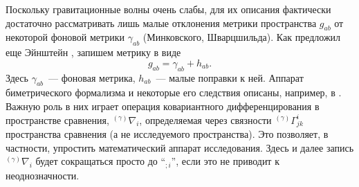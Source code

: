 \documentclass[\docroot/reports/draft/report.tex]{subfiles}
\begin{document}
    Поскольку гравитационные волны очень слабы, для их описания фактически достаточно рассматривать лишь малые отклонения метрики пространства $g_{ab}$ от некоторой фоновой метрики $\gamma_{ab}$ (Минковского, Шварцшильда). Как предложил еще Эйнштейн \cite{einstein_grav_waves}, запишем метрику в виде
    \begin{equation}\label{eq:gab}
        g_{ab} = \gamma_{ab} + h_{ab} .
    \end{equation}
    Здесь $\gamma_{ab}$~--- фоновая метрика, $h_{ab}$~--- малые поправки к ней. Аппарат биметрического формализма и некоторые его следствия описаны, например, в \cite{burlankov_jetp_covar_cosn}. Важную роль в них играет операция ковариантного дифференцирования в пространстве сравнения, ${}^{(\gamma)}\nabla_i$, определяемая через связности ${}^{(\gamma)}\Gamma^i_{jk}$ пространства сравнения (а не исследуемого пространства). Это позволяет, в частности, упростить математический аппарат исследования. Здесь и далее запись ${}^{(\gamma)}\nabla_i$ будет сокращаться просто до \enquote{${}_{;i}$}, если это не приводит к неоднозначности.
\end{document}
